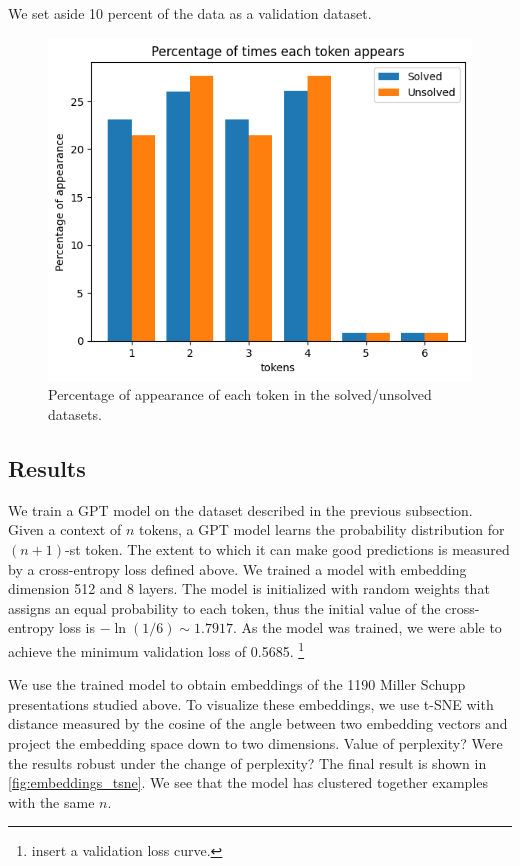 We set aside 10 percent of the data as a validation dataset.

\begin{figure}
	\centering
	\includegraphics[scale=0.6]{fig/tokens_hist.png}
	\caption{Percentage of appearance of each token in the solved/unsolved datasets.}
	\label{fig:tokens_hist}
\end{figure}

\subsection{Results}
We train a GPT model on the dataset described in the previous subsection.
Given a context of $n$ tokens, a GPT model learns the probability distribution for $(n+1)$-st token.
The extent to which it can make good predictions is measured by a cross-entropy loss defined above.
We trained a model with embedding dimension 512 and 8 layers.
The model is initialized with random weights that assigns an equal probability to each token, thus the initial value of the cross-entropy loss is $-\ln(1/6) \sim 1.7917$.
As the model was trained, we were able to achieve the minimum validation loss of 0.5685.
\footnote{insert a validation loss curve.}

We use the trained model to obtain embeddings of the 1190 Miller Schupp presentations studied above.
To visualize these embeddings, we use t-SNE with distance measured by the cosine of the angle between two embedding vectors and project the embedding space down to two dimensions.   Value of perplexity? Were the results robust under the change of perplexity?
The final result is shown in \autoref{fig:embeddings_tsne}.
We see that the model has clustered together examples with the same $n$.

